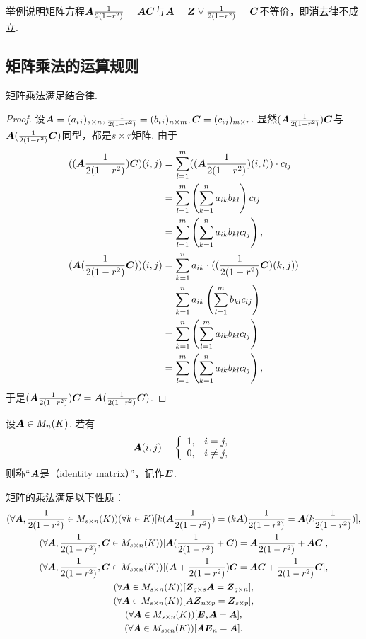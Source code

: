 \begin{example}
举例说明矩阵方程\(\A \B = \A \C\)与\(\A = \z \lor \B = \C\)不等价，即消去律不成立.
\end{example}

\subsection{矩阵乘法的运算规则}
\begin{theorem}
矩阵乘法满足结合律.
\begin{proof}
设\(\A = (a_{ij})_{s \times n},
\B = (b_{ij})_{n \times m},
\C = (c_{ij})_{m \times r}\).
显然\((\A\B)\C\)与\(\A(\B\C)\)同型，都是\(s \times r\)矩阵.
由于\begin{align*}
	\MatrixEntry{((\A\B)\C)}{i,j}
	&= \sum\limits_{l=1}^m (\MatrixEntry{(\A\B)}{i,l}) \cdot c_{lj} \\
	&= \sum\limits_{l=1}^m \left( \sum\limits_{k=1}^n a_{ik} b_{kl} \right) c_{lj} \\
	&= \sum\limits_{l=1}^m \left( \sum\limits_{k=1}^n a_{ik} b_{kl} c_{lj} \right), \\
	\MatrixEntry{(\A(\B\C))}{i,j}
	&= \sum\limits_{k=1}^n a_{ik} \cdot (\MatrixEntry{(\B\C)}{k,j}) \\
	&= \sum\limits_{k=1}^n a_{ik} \left( \sum\limits_{l=1}^m b_{kl} c_{lj} \right) \\
	&= \sum\limits_{k=1}^n \left( \sum\limits_{l=1}^m a_{ik} b_{kl} c_{lj} \right) \\
	&= \sum\limits_{l=1}^m \left( \sum\limits_{k=1}^n a_{ik} b_{kl} c_{lj} \right),
\end{align*}
于是\((\A\B)\C = \A(\B\C)\).
\end{proof}
\end{theorem}

\begin{definition}
设\(\A\in M_n(K)\).
若有\[
	\A(i,j) = \left\{ \begin{array}{cl}
		1, & i=j, \\
		0, & i\neq j,
	\end{array} \right.
\]
则称“\(\A\)是（identity matrix）”，记作\(\E\).
\end{definition}

\begin{property}
矩阵的乘法满足以下性质：
\begin{gather}
	(\forall\A,\B\in M_{s\times n}(K))(\forall k\in K)[k(\A\B) = (k\A)\B = \A(k\B)], \\
	(\forall\A,\B,\C\in M_{s\times n}(K))[\A(\B+\C) = \A\B + \A\C], \\
	(\forall\A,\B,\C\in M_{s\times n}(K))[(\A+\B)\C = \A\C + \B\C], \\
	(\forall\A\in M_{s\times n}(K))[\z_{q \times s} \A = \z_{q \times n}], \\
	(\forall\A\in M_{s\times n}(K))[\A \z_{n \times p} = \z_{s \times p}], \\
	(\forall\A\in M_{s\times n}(K))[\E_s \A = \A], \\
	(\forall\A\in M_{s\times n}(K))[\A \E_n = \A].
\end{gather}
\end{property}

